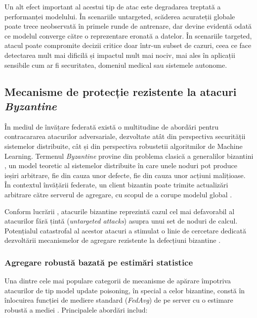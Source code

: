 \documentclass[../../main.tex]{subfiles}
\begin{document}
Un alt efect important al acestui tip de atac este degradarea treptată a perfor\-manței modelului.
În scenariile untargeted, scăderea acurateții globale poate trece neobservată în primele runde de antrenare, dar devine evidentă odată ce modelul converge către o reprezentare eronată a datelor.
În scenariile targeted, atacul poate compromite decizii critice doar într-un subset de cazuri, ceea ce face detectarea mult mai dificilă și impactul mult mai nociv, mai ales în aplicații sensibile cum ar fi securitatea, domeniul medical sau sistemele autonome.

    \subsection{Mecanisme de protecție rezistente la atacuri \textit{Byzantine}}

    În mediul de învățare federată există o multitudine de abordări pentru contracararea atacurilor adversariale, dezvoltate atât din perspectiva securității sistemelor distribuite, cât și din perspectiva robustetii algoritmilor de Machine Learning. Termenul \textit{Byzantine} provine din problema clasică a generalilor bizantini \cite{lamport1982byzantine}, un model teoretic al sistemelor distribuite în care unele noduri pot produce ieșiri arbitrare, fie din cauza unor defecte, fie din cauza unor acțiuni malițioase. În contextul învățării federate, un client bizantin poate trimite actualizări arbitrare către serverul de agregare, cu scopul de a corupe modelul global \cite{kairouz2021federated}.

    Conform lucrării \cite{kairouz2021federated}, atacurile bizantine reprezintă cazul cel mai defavorabil al atacurilor fără țintă (\textit{untargeted attacks}) asupra unui set de noduri de calcul. Potențialul catastrofal al acestor atacuri a stimulat o linie de cercetare dedicată dezvoltării mecanismelor de agregare rezistente la defecțiuni bizantine \cite{blanchard2017byzantine, chen2018draco, yin2019byzantine}.

    \subsubsection{Agregare robustă bazată pe estimări statistice}

    Una dintre cele mai populare categorii de mecanisme de apărare împotriva atacurilor de tip model update poisoning, în special a celor bizantine, constă în înlocuirea funcției de mediere standard (\textit{FedAvg}) de pe server cu o estimare robustă a mediei \cite{kairouz2021federated}. Principalele abordări includ:
\end{document}
